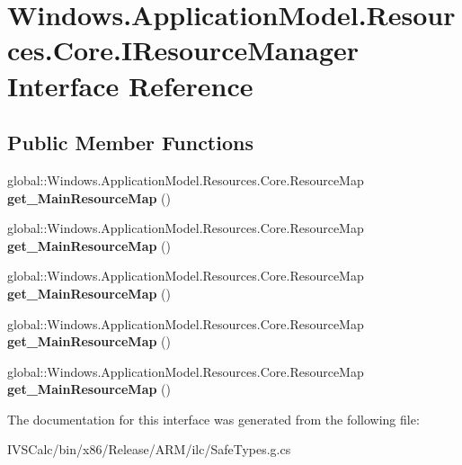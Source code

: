 \hypertarget{interface_windows_1_1_application_model_1_1_resources_1_1_core_1_1_i_resource_manager}{}\section{Windows.\+Application\+Model.\+Resources.\+Core.\+I\+Resource\+Manager Interface Reference}
\label{interface_windows_1_1_application_model_1_1_resources_1_1_core_1_1_i_resource_manager}
\subsection*{Public Member Functions}
\begin{DoxyCompactItemize}
\item 
\mbox{\label{interface_windows_1_1_application_model_1_1_resources_1_1_core_1_1_i_resource_manager_ad4a8ef7d5e503ef8518018cee1cc5349}} 
global\+::\+Windows.\+Application\+Model.\+Resources.\+Core.\+Resource\+Map {\bfseries get\+\_\+\+Main\+Resource\+Map} ()
\item 
\mbox{\label{interface_windows_1_1_application_model_1_1_resources_1_1_core_1_1_i_resource_manager_ad4a8ef7d5e503ef8518018cee1cc5349}} 
global\+::\+Windows.\+Application\+Model.\+Resources.\+Core.\+Resource\+Map {\bfseries get\+\_\+\+Main\+Resource\+Map} ()
\item 
\mbox{\label{interface_windows_1_1_application_model_1_1_resources_1_1_core_1_1_i_resource_manager_ad4a8ef7d5e503ef8518018cee1cc5349}} 
global\+::\+Windows.\+Application\+Model.\+Resources.\+Core.\+Resource\+Map {\bfseries get\+\_\+\+Main\+Resource\+Map} ()
\item 
\mbox{\label{interface_windows_1_1_application_model_1_1_resources_1_1_core_1_1_i_resource_manager_ad4a8ef7d5e503ef8518018cee1cc5349}} 
global\+::\+Windows.\+Application\+Model.\+Resources.\+Core.\+Resource\+Map {\bfseries get\+\_\+\+Main\+Resource\+Map} ()
\item 
\mbox{\label{interface_windows_1_1_application_model_1_1_resources_1_1_core_1_1_i_resource_manager_ad4a8ef7d5e503ef8518018cee1cc5349}} 
global\+::\+Windows.\+Application\+Model.\+Resources.\+Core.\+Resource\+Map {\bfseries get\+\_\+\+Main\+Resource\+Map} ()
\end{DoxyCompactItemize}


The documentation for this interface was generated from the following file\+:\begin{DoxyCompactItemize}
\item 
I\+V\+S\+Calc/bin/x86/\+Release/\+A\+R\+M/ilc/Safe\+Types.\+g.\+cs\end{DoxyCompactItemize}
